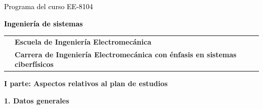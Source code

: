\documentclass[letterpaper]{article}%
\begin{document}
%
\normalsize%
\thispagestyle{empty}%
%
\vspace*{100mm}%
\par\fontsize{14}{0}\selectfont \textcolor{black}{Programa del curso EE{-}8104}%
\par\fontsize{18}{25}\selectfont \textbf{\textcolor{black}{Ingeniería de sistemas}}%
\vspace*{15mm}%
\newline%
\begin{tabularx}{\textwidth}{m{}m{}}%
&\hspace*{0mm}\fontsize{12}{0}\selectfont \textbf{\textcolor{gris}{Escuela de Ingeniería Electromecánica}}\\%
[-12pt]%
&\hspace*{0mm}\fontsize{12}{0}\selectfont \textbf{\textcolor{gris}{Carrera de Ingeniería Electromecánica con énfasis en sistemas ciberfísicos}}\\%
\end{tabularx}%
\newpage%
\pagestyle{headfoot}%
\par\fontsize{14}{0}\selectfont \textbf{\textcolor{parte}{I parte: Aspectos relativos al plan de estudios}}%
\par\hspace*{2mm}\fontsize{12}{14}\selectfont \textbf{\textcolor{parte}{1. Datos generales}}%
\vspace*{3mm}%
\newline%
\fontsize{10}{12}\selectfont %
\end{document}
